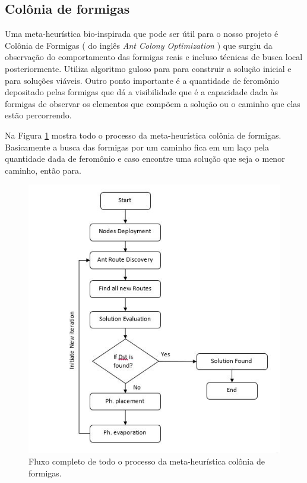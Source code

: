 \documentclass[conference]{IEEEtran}
\begin{document}
\subsection{Colônia de formigas}

Uma meta-heurística bio-inspirada que pode ser útil para o nosso projeto é Colônia de Formigas \cite{dorigo1999ant} ( do inglês \textit{Ant Colony Optimization} ) que surgiu da observação do
comportamento das formigas reais e incluso técnicas de busca local posteriormente. Utiliza algoritmo guloso para para construir a solução inicial e para soluções viáveis. Outro ponto
importante é a quantidade de feromônio depositado pelas formigas que dá a visibilidade que é a capacidade dada às formigas de observar os elementos que compõem a solução ou o caminho que
elas estão percorrendo.


Na Figura \ref{figura_ant} mostra todo o processo da meta-heurística colônia de formigas. Basicamente a busca das formigas por um caminho fica em um laço pela quantidade dada de feromônio e caso
encontre uma solução que seja o menor caminho, então para.

\begin{figure}[!htb]
  \centering
  \includegraphics[scale=0.5]{imagens/ant.jpeg}
 \caption{Fluxo completo de todo o processo da meta-heurística colônia de formigas. \cite{nayyar2017simulation}}
  \label{figura_ant}
\end{figure}
\end{document}
